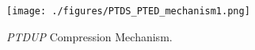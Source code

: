 
\begin{figure}[t]
  \centering
  \texttt{[image: ./figures/PTDS\_PTED\_mechanism1.png]}
  \vspace*{-2.5mm}
  \caption{\emph{PTDUP} Compression Mechanism.\label{PTDS_PTED_Mechanism}}
  \vspace*{-6.5mm}
\end{figure}

